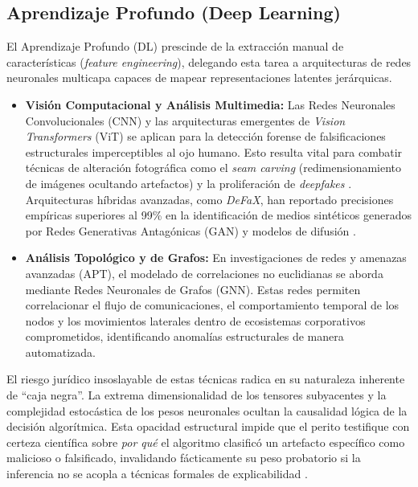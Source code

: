 \documentclass[journal]{IEEEtran}
\begin{document}
\subsection{Aprendizaje Profundo (Deep Learning)}
El Aprendizaje Profundo (DL) prescinde de la extracción manual de características (\textit{feature engineering}), delegando esta tarea a arquitecturas de redes neuronales multicapa capaces de mapear representaciones latentes jerárquicas.
\begin{itemize}
    \item \textbf{Visión Computacional y Análisis Multimedia:} Las Redes Neuronales Convolucionales (CNN) y las arquitecturas emergentes de \textit{Vision Transformers} (ViT) se aplican para la detección forense de falsificaciones estructurales imperceptibles al ojo humano. Esto resulta vital para combatir técnicas de alteración fotográfica como el \textit{seam carving} (redimensionamiento de imágenes ocultando artefactos) y la proliferación de \textit{deepfakes} \cite{BharatiNitu2026EddA, NevesMiguelJoseDas2025SCFD}. Arquitecturas híbridas avanzadas, como \textit{DeFaX}, han reportado precisiones empíricas superiores al 99\% en la identificación de medios sintéticos generados por Redes Generativas Antagónicas (GAN) y modelos de difusión \cite{Al-ImranMd2025DACF}.
    \item \textbf{Análisis Topológico y de Grafos:} En investigaciones de redes y amenazas avanzadas (APT), el modelado de correlaciones no euclidianas se aborda mediante Redes Neuronales de Grafos (GNN). Estas redes permiten correlacionar el flujo de comunicaciones, el comportamiento temporal de los nodos y los movimientos laterales dentro de ecosistemas corporativos comprometidos, identificando anomalías estructurales de manera automatizada.
\end{itemize}

El riesgo jurídico insoslayable de estas técnicas radica en su naturaleza inherente de ``caja negra''. La extrema dimensionalidad de los tensores subyacentes y la complejidad estocástica de los pesos neuronales ocultan la causalidad lógica de la decisión algorítmica. Esta opacidad estructural impide que el perito testifique con certeza científica sobre \textit{por qué} el algoritmo clasificó un artefacto específico como malicioso o falsificado, invalidando fácticamente su peso probatorio si la inferencia no se acopla a técnicas formales de explicabilidad \cite{VASILARAS2024301737}.
\end{document}
